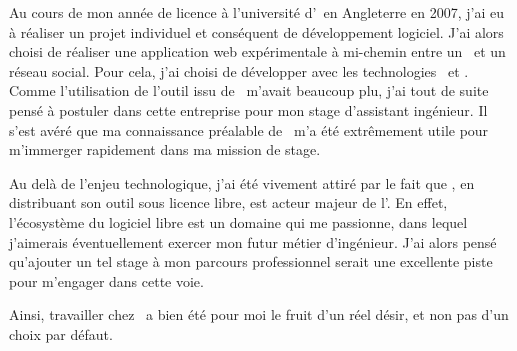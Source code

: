 Au cours de mon année de licence à l'université d'\abrookes\ en Angleterre en 2007, j'ai eu à réaliser un projet individuel et conséquent de développement logiciel. J'ai alors choisi de réaliser une application web expérimentale à mi-chemin entre un \acms\ et un réseau social. Pour cela, j'ai choisi de développer avec les technologies \aphp\ et \asf. Comme l'utilisation de l'outil issu de \asl\ m'avait beaucoup plu, j'ai tout de suite pensé à postuler dans cette entreprise pour mon stage d'assistant ingénieur. Il s'est avéré que ma connaissance préalable de \asf\ m'a été extrêmement utile pour m'immerger rapidement dans ma mission de stage.

Au delà de l'enjeu technologique, j'ai été vivement attiré par le fait que \asl, en distribuant son outil sous licence libre, est acteur majeur de l'\aos. En effet, l'écosystème du logiciel libre est un domaine qui me passionne, dans lequel j'aimerais éventuellement exercer mon futur métier d'ingénieur. J'ai alors pensé qu'ajouter un tel stage à mon parcours professionnel serait une excellente piste pour m'engager dans cette voie.

Ainsi, travailler chez \asl\ a bien été pour moi le fruit d'un réel désir, et non pas d'un choix par défaut.
